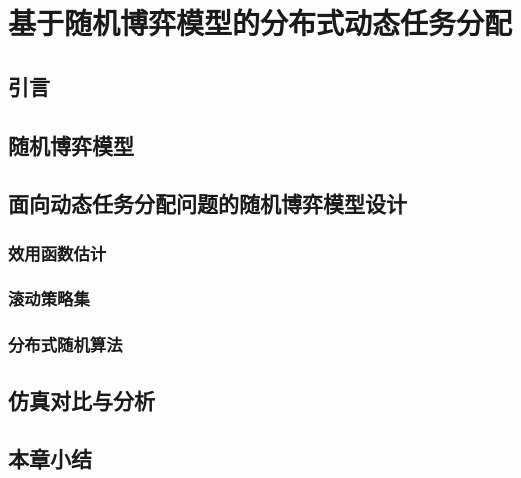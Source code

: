 
\chapter{基于随机博弈模型的分布式动态任务分配}
\label{chap:stochastic}

\section{引言}
\label{sg:intro}

\section{随机博弈模型}
\label{sg:change_target}

\section{面向动态任务分配问题的随机博弈模型设计}
\label{sg:model}

\subsection{效用函数估计}
\label{sg:model:utility}

\subsection{滚动策略集}
\label{sg:model:recycle}

\subsection{分布式随机算法}
\label{sg:model:dsa}

\section{仿真对比与分析}

\section{本章小结}
\label{reassign:sec:conclusion}

